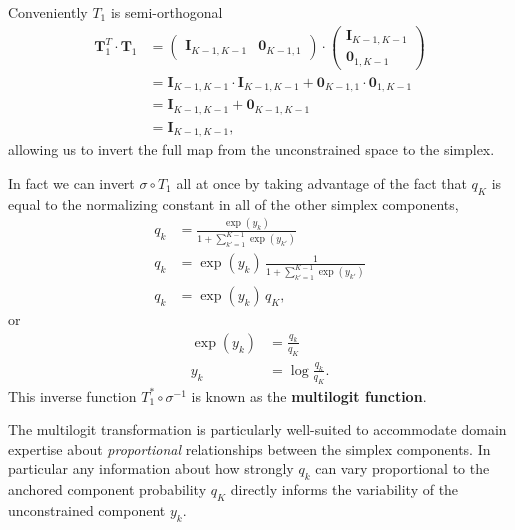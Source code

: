 \documentclass[
  letterpaper,
  DIV=11,
  numbers=noendperiod]{scrartcl}
\begin{document}
Conveniently \(T_{1}\) is semi-orthogonal \begin{align*}
\mathbf{T}_{1}^{T} \cdot \mathbf{T}_{1}
&=
\begin{pmatrix}
\mathbf{I}_{K - 1, K - 1} &
\mathbf{0}_{K - 1, 1}
\end{pmatrix}
\cdot
\begin{pmatrix}
\mathbf{I}_{K - 1, K - 1} \\
\mathbf{0}_{1, K - 1}
\end{pmatrix}
\\
&=
\mathbf{I}_{K - 1, K - 1} \cdot \mathbf{I}_{K - 1, K - 1}
+ \mathbf{0}_{K - 1, 1} \cdot \mathbf{0}_{1, K - 1}
\\
&=
\mathbf{I}_{K - 1, K - 1} + \mathbf{0}_{K - 1, K - 1}
\\
&=
\mathbf{I}_{K - 1, K - 1},
\end{align*} allowing us to invert the full map from the unconstrained
space to the simplex.

In fact we can invert \(\sigma \circ T_{1}\) all at once by taking
advantage of the fact that \(q_{K}\) is equal to the normalizing
constant in all of the other simplex components, \begin{align*}
q_{k}
&=
\frac{ \exp( y_{k} ) }{ 1 + \sum_{k' = 1}^{K - 1} \exp( y_{k'} ) }
\\
q_{k}
&=
\exp( y_{k} ) \, \frac{ 1 }{ 1 + \sum_{k' = 1}^{K - 1} \exp( y_{k'} ) }
\\
q_{k}
&=
\exp( y_{k} ) \, q_{K},
\end{align*} or \begin{align*}
\exp( y_{k} ) &= \frac{q_{k}}{q_{K}}
\\
y_{k} &= \log \frac{q_{k}}{q_{K}}.
\end{align*} This inverse function \(T_{1}^{*} \circ \sigma^{-1}\) is
known as the \textbf{multilogit function}.

The multilogit transformation is particularly well-suited to accommodate
domain expertise about \emph{proportional} relationships between the
simplex components. In particular any information about how strongly
\(q_{k}\) can vary proportional to the anchored component probability
\(q_{K}\) directly informs the variability of the unconstrained
component \(y_{k}\).
\end{document}
